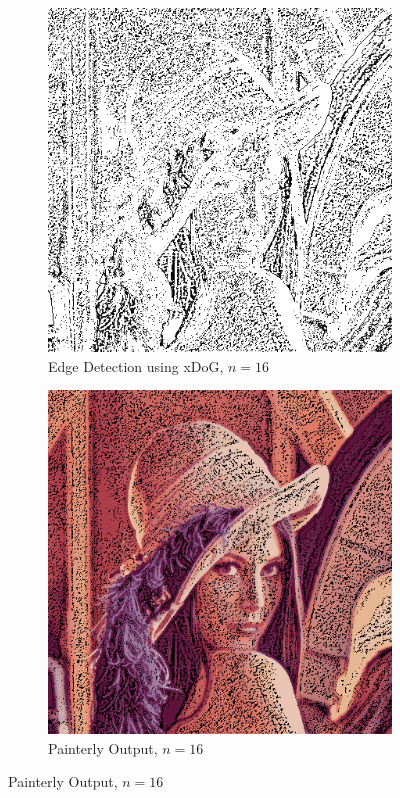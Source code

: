 \documentclass{article}
\begin{document}
\begin{figure}[!ht]
\begin{subfigure}{.5\textwidth}
\centering
\includegraphics[width=.75\linewidth]{xdogsig16.png}
\caption{Edge Detection using xDoG, $n = 16$}
\end{subfigure}
\begin{subfigure}{.5\textwidth}
\centering
\includegraphics[width=.75\linewidth]{pastelsig16.png}
\caption{Painterly Output, $n = 16$}
\end{subfigure}
\end{figure}
\end{document}
